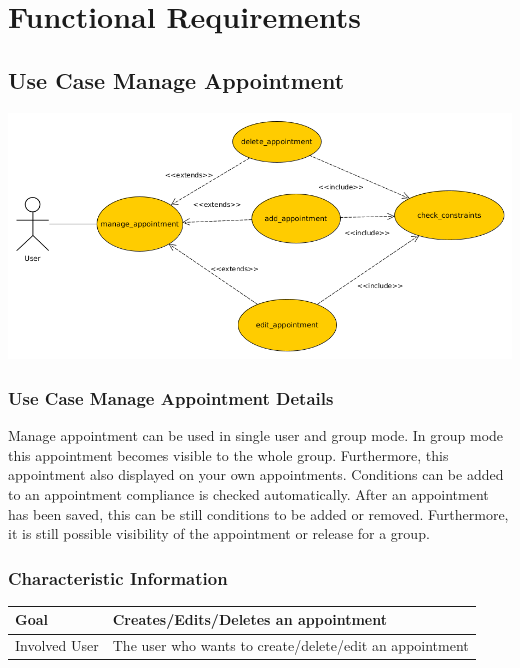 \documentclass[12pt]{scrartcl}
\begin{document}

    \section{Functional Requirements}                           %

    \subsection{Use Case Manage Appointment} 
        \includegraphics[scale=.5]{Materials/Images/manage_appointment_use_case.png}
    \subsubsection{Use Case Manage Appointment Details} 
        Manage appointment can be used in single user and group mode. In group mode
        this appointment becomes visible to the whole group. Furthermore, this appointment
        also displayed on your own appointments. Conditions can be added to an appointment
        compliance is checked automatically. After an appointment has been saved, this can be
        still conditions to be added or removed. Furthermore, it is still possible visibility
        of the appointment or release for a group.
    \subsubsection{Characteristic Information} 
        \begin{tabular}{|l|l|}
            \hline
            Goal & Creates/Edits/Deletes an appointment \\ \hline
            Involved User & The user who wants to create/delete/edit an appointment \\ \hline
        \end{tabular}
\end{document}
